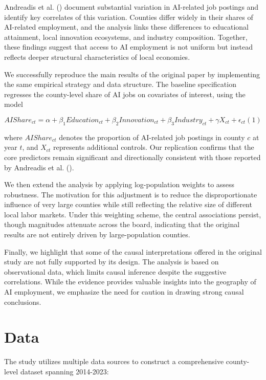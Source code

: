\documentclass[
]{article}
\begin{document}
Andreadis et al. () document
substantial variation in AI-related job postings and identify key
correlates of this variation. Counties differ widely in their shares of
AI-related employment, and the analysis links these differences to
educational attainment, local innovation ecosystems, and industry
composition. Together, these findings suggest that access to AI
employment is not uniform but instead reflects deeper structural
characteristics of local economies.

We successfully reproduce the main results of the original paper by
implementing the same empirical strategy and data structure. The
baseline specification regresses the county-level share of AI jobs on
covariates of interest, using the model

\[
AIShare_{ct} = \alpha + \beta_1 Education_{ct} + \beta_2 Innovation_{ct} + \beta_3 Industry_{ct} + \gamma X_{ct} + \epsilon_{ct} (1)
\]

where \(AIShare_{ct}\) denotes the proportion of AI-related job postings
in county \(c\) at year \(t\), and \(X_{ct}\) represents additional
controls. Our replication confirms that the core predictors remain
significant and directionally consistent with those reported by
Andreadis et al. ().

We then extend the analysis by applying log-population weights to assess
robustness. The motivation for this adjustment is to reduce the
disproportionate influence of very large counties while still reflecting
the relative size of different local labor markets. Under this weighting
scheme, the central associations persist, though magnitudes attenuate
across the board, indicating that the original results are not entirely
driven by large-population counties.

Finally, we highlight that some of the causal interpretations offered in
the original study are not fully supported by its design. The analysis
is based on observational data, which limits causal inference despite
the suggestive correlations. While the evidence provides valuable
insights into the geography of AI employment, we emphasize the need for
caution in drawing strong causal conclusions.

\section{Data}\label{data}

The study utilizes multiple data sources to construct a comprehensive
county-level dataset spanning 2014-2023:
\end{document}
